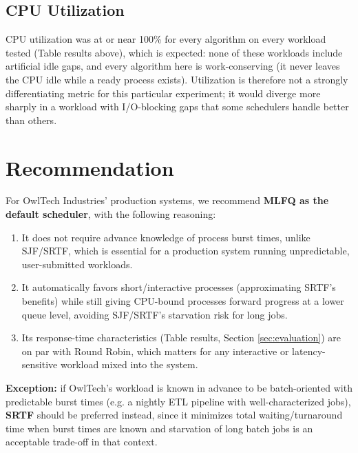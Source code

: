 \documentclass[11pt]{article}
\begin{document}
\subsection{CPU Utilization}

CPU utilization was at or near 100\% for every algorithm on every workload
tested (Table results above), which is expected: none of these workloads
include artificial idle gaps, and every algorithm here is work-conserving
(it never leaves the CPU idle while a ready process exists). Utilization
is therefore not a strongly differentiating metric for this particular
experiment; it would diverge more sharply in a workload with I/O-blocking
gaps that some schedulers handle better than others.

\section{Recommendation}

For OwlTech Industries' production systems, we recommend \textbf{MLFQ as
the default scheduler}, with the following reasoning:

\begin{enumerate}
  \item It does not require advance knowledge of process burst times,
    unlike SJF/SRTF, which is essential for a production system running
    unpredictable, user-submitted workloads.
  \item It automatically favors short/interactive processes (approximating
    SRTF's benefits) while still giving CPU-bound processes forward
    progress at a lower queue level, avoiding SJF/SRTF's starvation risk
    for long jobs.
  \item Its response-time characteristics (Table results, Section
    \ref{sec:evaluation}) are on par with Round Robin, which matters for
    any interactive or latency-sensitive workload mixed into the system.
\end{enumerate}

\textbf{Exception:} if OwlTech's workload is known in advance to be
batch-oriented with predictable burst times (e.g. a nightly ETL pipeline
with well-characterized jobs), \textbf{SRTF} should be preferred instead,
since it minimizes total waiting/turnaround time when burst times are
known and starvation of long batch jobs is an acceptable trade-off in that
context.
\end{document}
